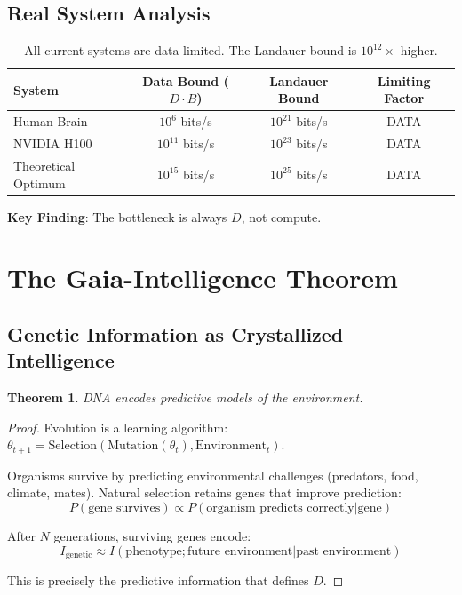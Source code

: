 \documentclass{article}
\newtheorem{theorem}{Theorem}[section]
\begin{document}
\subsection{Real System Analysis}

\begin{table}[h]
\centering
\begin{tabular}{@{}lccc@{}}
\toprule
System & Data Bound ($D \cdot B$) & Landauer Bound & Limiting Factor \\
\midrule
Human Brain & $10^6$ bits/s & $10^{21}$ bits/s & DATA \\
NVIDIA H100 & $10^{11}$ bits/s & $10^{23}$ bits/s & DATA \\
Theoretical Optimum & $10^{15}$ bits/s & $10^{25}$ bits/s & DATA \\
\bottomrule
\end{tabular}
\caption{All current systems are data-limited. The Landauer bound is $10^{12}\times$ higher.}
\label{tab:systems}
\end{table}

\textbf{Key Finding}: The bottleneck is always $D$, not compute.

\section{The Gaia-Intelligence Theorem}

\subsection{Genetic Information as Crystallized Intelligence}

\begin{theorem}
DNA encodes predictive models of the environment.
\end{theorem}

\begin{proof}
Evolution is a learning algorithm: $\theta_{t+1} = \text{Selection}(\text{Mutation}(\theta_t), \text{Environment}_t)$.

Organisms survive by predicting environmental challenges (predators, food, climate, mates). Natural selection retains genes that improve prediction:
\begin{equation}
P(\text{gene survives}) \propto P(\text{organism predicts correctly} | \text{gene})
\end{equation}

After $N$ generations, surviving genes encode:
\begin{equation}
I_{\text{genetic}} \approx I(\text{phenotype}; \text{future environment} | \text{past environment})
\end{equation}

This is precisely the predictive information that defines $D$.
\end{proof}
\end{document}
